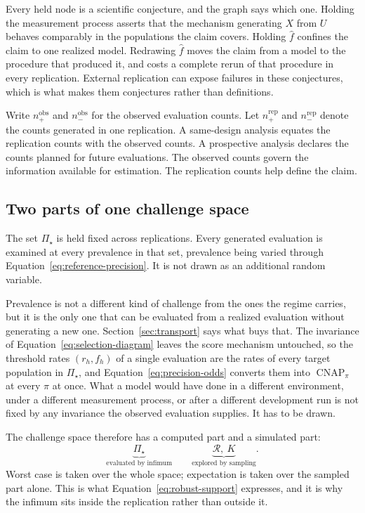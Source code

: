 \documentclass[11pt]{article}
\newcommand{\CNAP}{\operatorname{CNAP}}
\newcommand{\Regime}{\mathcal{R}}
\newcommand{\PSet}{\Pi_\star}
\theoremstyle{remark}
\begin{document}
Every held node is a scientific conjecture, and the graph says which one. Holding the measurement process asserts that the mechanism generating $X$ from $U$ behaves comparably in the populations the claim covers. Holding $\widehat f$ confines the claim to one realized model. Redrawing $\widehat f$ moves the claim from a model to the procedure that produced it, and costs a complete rerun of that procedure in every replication. External replication can expose failures in these conjectures, which is what makes them conjectures rather than definitions.

Write $n_+^{\mathrm{obs}}$ and $n_-^{\mathrm{obs}}$ for the observed evaluation counts. Let $n_+^{\mathrm{rep}}$ and $n_-^{\mathrm{rep}}$ denote the counts generated in one replication. A same-design analysis equates the replication counts with the observed counts. A prospective analysis declares the counts planned for future evaluations. The observed counts govern the information available for estimation. The replication counts help define the claim.

\subsection{Two parts of one challenge space}
\label{sec:challenge-space}

The set $\PSet$ is held fixed across replications. Every generated evaluation is examined at every prevalence in that set, prevalence being varied through Equation~\eqref{eq:reference-precision}. It is not drawn as an additional random variable.

Prevalence is not a different kind of challenge from the ones the regime carries, but it is the only one that can be evaluated from a realized evaluation without generating a new one. Section~\ref{sec:transport} says what buys that. The invariance of Equation~\eqref{eq:selection-diagram} leaves the score mechanism untouched, so the threshold rates $(r_h,f_h)$ of a single evaluation are the rates of every target population in $\PSet$, and Equation~\eqref{eq:precision-odds} converts them into $\CNAP_\pi$ at every $\pi$ at once. What a model would have done in a different environment, under a different measurement process, or after a different development run is not fixed by any invariance the observed evaluation supplies. It has to be drawn.

The challenge space therefore has a computed part and a simulated part:
\[
\underbrace{\PSet}_{\text{evaluated by infimum}}
\qquad
\underbrace{\Regime,\ K}_{\text{explored by sampling}}.
\]
Worst case is taken over the whole space; expectation is taken over the sampled part alone. This is what Equation~\eqref{eq:robust-support} expresses, and it is why the infimum sits inside the replication rather than outside it.
\end{document}
